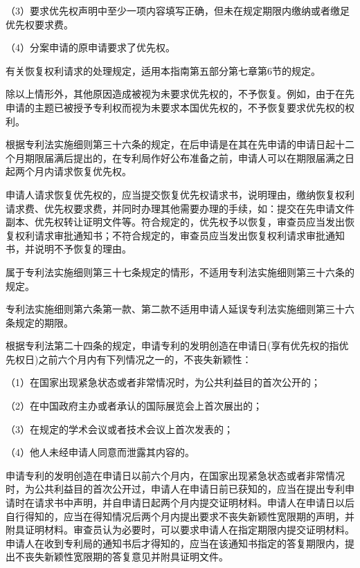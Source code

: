 {\setlength{\parindent}{17.1bp}（3）要求优先权声明中至少一项内容填写正确，但未在规定期限内缴纳或者缴足优先权要求费。\par}

{\setlength{\parindent}{17.1bp}（4）分案申请的原申请要求了优先权。\par}

有关恢复权利请求的处理规定，适用本指南第五部分第七章第6节的规定。

除以上情形外，其他原因造成被视为未要求优先权的，不予恢复。例如，由于在先申请的主题已被授予专利权而视为未要求本国优先权的，不予恢复要求优先权的权利。

根据专利法实施细则第三十六条的规定，在后申请是在其在先申请的申请日起十二个月期限届满后提出的，在专利局作好公布准备之前，申请人可以在期限届满之日起两个月内请求恢复优先权。

申请人请求恢复优先权的，应当提交恢复优先权请求书，说明理由，缴纳恢复权利请求费、优先权要求费，并同时办理其他需要办理的手续，如：提交在先申请文件副本、优先权转让证明文件等。符合规定的，优先权予以恢复，审查员应当发出恢复权利请求审批通知书；不符合规定的，审查员应当发出恢复权利请求审批通知书，并说明不予恢复的理由。

属于专利法实施细则第三十七条规定的情形，不适用专利法实施细则第三十六条的规定。

专利法实施细则第六条第一款、第二款不适用申请人延误专利法实施细则第三十六条规定的期限。

根据专利法第二十四条的规定，申请专利的发明创造在申请日(享有优先权的指优先权日)之前六个月内有下列情况之一的，不丧失新颖性：

（1）在国家出现紧急状态或者非常情况时，为公共利益目的首次公开的；

（2）在中国政府主办或者承认的国际展览会上首次展出的；

（3）在规定的学术会议或者技术会议上首次发表的；

（4）他人未经申请人同意而泄露其内容的。

申请专利的发明创造在申请日以前六个月内，在国家出现紧急状态或者非常情况时，为公共利益目的首次公开过，申请人在申请日前已获知的，应当在提出专利申请时在请求书中声明，并自申请日起两个月内提交证明材料。申请人在申请日以后自行得知的，应当在得知情况后两个月内提出要求不丧失新颖性宽限期的声明，并附具证明材料。审查员认为必要时，可以要求申请人在指定期限内提交证明材料。申请人在收到专利局的通知书后才得知的，应当在该通知书指定的答复期限内，提出不丧失新颖性宽限期的答复意见并附具证明文件。

